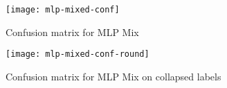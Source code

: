 \begin{figure}
  \centering
  \texttt{[image: mlp-mixed-conf]}
  \caption{Confusion matrix for MLP Mix}
  \label{fig:mlp-mixed-conf}
\end{figure}

\begin{figure}
  \centering
  \texttt{[image: mlp-mixed-conf-round]}
  \caption{Confusion matrix for MLP Mix on collapsed labels}
  \label{fig:mlp-mixed-conf-round}
\end{figure}
